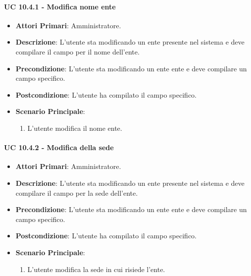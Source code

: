 				\paragraph{UC 10.4.1 - Modifica nome ente}
				\begin{itemize}
					\item \textbf{Attori Primari}: Amministratore.
					\item \textbf{Descrizione}: L'utente sta modificando un ente presente nel sistema e deve compilare il campo per il nome dell'ente.
					\item \textbf{Precondizione}: L'utente sta modificando un ente ente e deve compilare un campo specifico.
					\item \textbf{Postcondizione}: L'utente ha compilato il campo specifico.
					\item \textbf{Scenario Principale}:
					\begin{enumerate}
						\item L'utente modifica il nome ente.
					\end{enumerate}	
				\end{itemize}	

				\paragraph{UC 10.4.2 - Modifica della sede}
				\begin{itemize}
					\item \textbf{Attori Primari}: Amministratore.
					\item \textbf{Descrizione}: L'utente sta modificando un ente presente nel sistema e deve compilare il campo per la sede dell'ente.
					\item \textbf{Precondizione}: L'utente sta modificando un ente ente e deve compilare un campo specifico.
					\item \textbf{Postcondizione}: L'utente ha compilato il campo specifico.
					\item \textbf{Scenario Principale}:
					\begin{enumerate}
						\item L'utente modifica la sede in cui risiede l'ente.
					\end{enumerate}	
				\end{itemize}	


